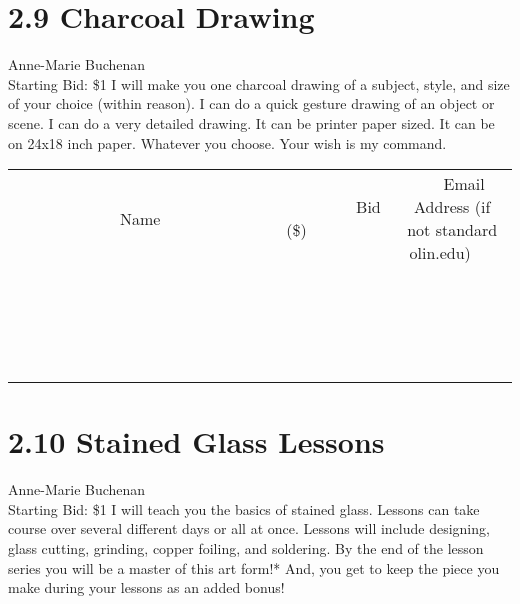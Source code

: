 \documentclass[11pt]{article}
\begin{document}
\section*{2.9 Charcoal Drawing}
Anne-Marie Buchenan
\\
Starting Bid: \$1
\newline
I will make you one charcoal drawing of a subject, style, and size of your choice (within reason). I can do a quick gesture drawing of an object or scene. I can do a very detailed drawing. It can be printer paper sized. It can be on 24x18 inch paper. Whatever you choose. Your wish is my command.
\\[3ex]
\begin{tabular}{c c c}
~~~~~~~~~~~~~Name~~~~~~~~~~~~~ & ~~~~~~~~~Bid (\$)~~~~~~~~~  & ~~~Email Address (if not standard olin.edu)~~~\\
 & & \\
\hline
 & & \\
\hline
 & & \\
\hline
 & & \\
\hline
 & & \\
\hline
 & & \\
\hline
 & & \\
\hline
 & & \\
\hline
 & & \\
\hline
 & & \\
\hline
 & & \\
\hline
 & & \\
\hline
 & & \\
\hline
 & & \\
\hline
 & & \\
\hline
 & & \\
\hline
 & & \\
\hline
 & & \\
\hline
 & & \\
\hline
\end{tabular}
\newpage
\section*{2.10 Stained Glass Lessons}
Anne-Marie Buchenan
\\
Starting Bid: \$1
\newline
I will teach you the basics of stained glass. Lessons can take course over several different days or all at once. Lessons will include designing, glass cutting, grinding, copper foiling, and soldering. By the end of the lesson series you will be a master of this art form!* And, you get to keep the piece you make during your lessons as an added bonus!
\end{document}
